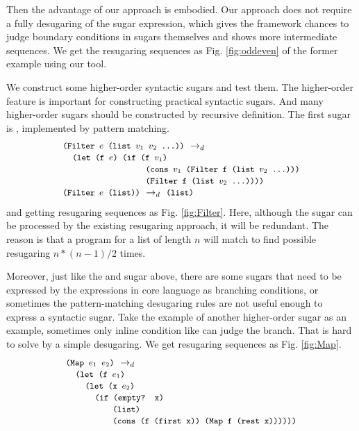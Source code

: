 Then the advantage of our approach is embodied. Our approach does not require a fully desugaring of the sugar expression, which gives the framework chances to judge boundary conditions in sugars themselves and shows more intermediate sequences. We get the resugaring sequences as Fig.  \ref{fig:oddeven} of the former example using our tool.



We construct some higher-order syntactic sugars and test them. The higher-order feature is important for constructing practical syntactic sugars. And many higher-order sugars should be constructed by recursive definition. The first sugar is , implemented by pattern matching.
\[\begin{array}{l}
\texttt{\small(Filter $e$ (list $v_1$ $v_2$ ...))} ~\rightarrow_d~\\
\quad
\texttt{\small (let (f $e$) (if (f $v_1$)}\\
\qquad\qquad\qquad\qquad\;\;\texttt{\small (cons $v_1$ (Filter f (list $v_2$ ...)))}\\
\qquad\qquad\qquad\qquad\;\;\texttt{\small (Filter f (list $v_2$ ...))))}\\

\texttt{\small(Filter $e$ (list))} ~\rightarrow_d~ \texttt{\small(list)}
\end{array}\]
and getting resugaring sequences as Fig.  \ref{fig:Filter}.
Here, although the sugar can be processed by the existing resugaring approach, it will be redundant. The reason is that a  program for a list of length $n$ will match to find possible resugaring $n*(n-1)/2$ times. 

Moreover, just like the  and  sugar above, there are some sugars that need to be expressed by the expressions in core language as branching conditions, or sometimes the pattern-matching desugaring rules are not useful enough to express a syntactic sugar. Take the example of another higher-order sugar  as an example, sometimes only inline condition like  can judge the branch. That is hard to solve by a simple desugaring. We get resugaring sequences as Fig.  \ref{fig:Map}.
\[
\begin{array}{l}
\texttt{\small(Map $e_1$ $e_2$)} ~\rightarrow_d~\\
\quad\texttt{\small (let (f $e_1$)}\\
\qquad\texttt{\small(let (x $e_2$)}\\
\qquad\quad

\texttt{\small(if (empty? x)}\\
\qquad\qquad\;\;\;\texttt{\small(list)}\\
\qquad\qquad\;\;\;\texttt{\small(cons (f (first x)) (Map f (rest x))))))}


\end{array}
\]



